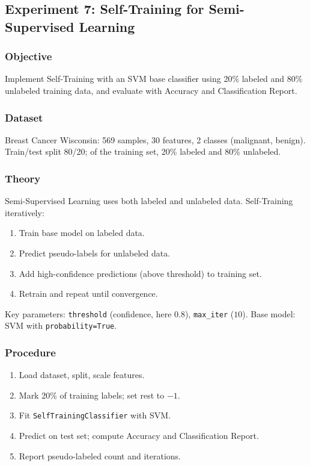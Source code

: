\documentclass[a4paper,10pt]{article}
\begin{document}
\subsection{Experiment 7: Self-Training for Semi-Supervised Learning}

\subsubsection{Objective}
Implement Self-Training with an SVM base classifier using 20\% labeled and 80\% unlabeled training data, and evaluate with Accuracy and Classification Report.

\subsubsection{Dataset}
Breast Cancer Wisconsin: 569 samples, 30 features, 2 classes (malignant, benign). Train/test split 80/20; of the training set, 20\% labeled and 80\% unlabeled.

\subsubsection{Theory}
Semi-Supervised Learning uses both labeled and unlabeled data. Self-Training iteratively:
\begin{enumerate}[nosep]
    \item Train base model on labeled data.
    \item Predict pseudo-labels for unlabeled data.
    \item Add high-confidence predictions (above threshold) to training set.
    \item Retrain and repeat until convergence.
\end{enumerate}
Key parameters: \texttt{threshold} (confidence, here \(0.8\)), \texttt{max\_iter} (\(10\)). Base model: SVM with \texttt{probability=True}.

\subsubsection{Procedure}
\begin{enumerate}[nosep]
    \item Load dataset, split, scale features.
    \item Mark 20\% of training labels; set rest to \(-1\).
    \item Fit \texttt{SelfTrainingClassifier} with SVM.
    \item Predict on test set; compute Accuracy and Classification Report.
    \item Report pseudo-labeled count and iterations.
\end{enumerate}
\end{document}
